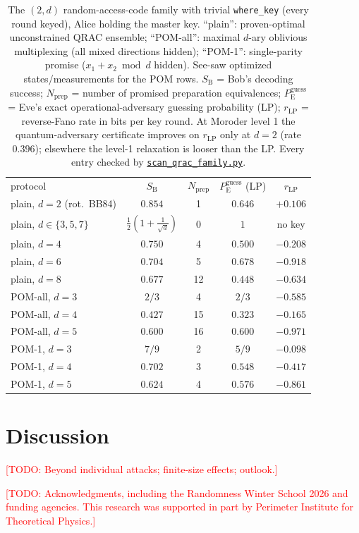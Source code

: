 \documentclass[aps,pra,twocolumn,superscriptaddress,longbibliography,nofootinbib]{revtex4-2}
\newcommand{\Eve}{\mathrm{E}}
\newcommand{\Bob}{\mathrm{B}}
\newcommand{\pguess}{P_{\Eve}^{\mathrm{guess}}}
\newcommand{\wherekey}{\texttt{where\_key}}
\newcommand{\todo}[1]{\textcolor{red}{[TODO: #1]}}
\newcommand{\repoBase}{https://github.com/eliewolfe/RandomnessWinterSchool2026/blob/main/paper/scripts}
\newcommand{\repoScript}[1]{\href{\repoBase/#1}{\texttt{#1}}}
\begin{document}
\begin{table}
\caption{\label{tab:qrac}The $(2,d)$ random-access-code family with
trivial \wherekey{} (every round keyed), Alice holding the master key.
``plain'': proven-optimal unconstrained QRAC ensemble; ``POM-all'':
maximal $d$-ary oblivious multiplexing (all mixed directions hidden);
``POM-1'': single-parity promise ($x_1{+}x_2 \bmod d$ hidden). See-saw
optimized states/measurements for the POM rows. $S_{\Bob}$ = Bob's
decoding success; $N_{\mathrm{prep}}$ = number of promised preparation
equivalences; $\pguess$ = Eve's exact operational-adversary guessing
probability (LP); $r_{\mathrm{LP}}$ = reverse-Fano rate in bits per key
round. At Moroder level 1 the quantum-adversary certificate improves on
$r_{\mathrm{LP}}$ only at $d=2$ (rate $0.396$); elsewhere the level-1
relaxation is looser than the LP. Every entry checked by
\repoScript{scan\_qrac\_family.py}.}
\begin{ruledtabular}
\begin{tabular}{lcccc}
protocol & $S_{\Bob}$ & $N_{\mathrm{prep}}$ & $\pguess$ (LP) & $r_{\mathrm{LP}}$ \\
\colrule
plain, $d=2$ (rot.\ BB84) & $0.854$ & 1 & $0.646$ & $+0.106$ \\
plain, $d\in\{3,5,7\}$ & $\tfrac12(1{+}\tfrac{1}{\sqrt d})$ & 0 & $1$ & no key \\
plain, $d=4$ & $0.750$ & 4 & $0.500$ & $-0.208$ \\
plain, $d=6$ & $0.704$ & 5 & $0.678$ & $-0.918$ \\
plain, $d=8$ & $0.677$ & 12 & $0.448$ & $-0.634$ \\
\colrule
POM-all, $d=3$ & $2/3$ & 4 & $2/3$ & $-0.585$ \\
POM-all, $d=4$ & $0.427$ & 15 & $0.323$ & $-0.165$ \\
POM-all, $d=5$ & $0.600$ & 16 & $0.600$ & $-0.971$ \\
\colrule
POM-1, $d=3$ & $7/9$ & 2 & $5/9$ & $-0.098$ \\
POM-1, $d=4$ & $0.702$ & 3 & $0.548$ & $-0.417$ \\
POM-1, $d=5$ & $0.624$ & 4 & $0.576$ & $-0.861$ \\
\end{tabular}
\end{ruledtabular}
\end{table}

\section{Discussion}
\label{sec:discussion}

\todo{Beyond individual attacks; finite-size effects; outlook.}

\begin{acknowledgments}
\todo{Acknowledgments, including the Randomness Winter School 2026 and
funding agencies. This research was supported in part by Perimeter
Institute for Theoretical Physics.}
\end{acknowledgments}


\end{document}
